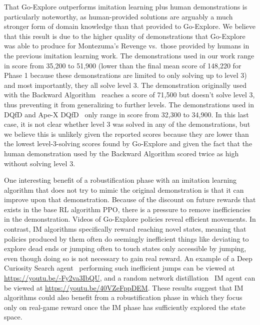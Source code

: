 \documentclass{article}
\begin{document}
That Go-Explore outperforms imitation learning plus human demonstrations is particularly noteworthy, as human-provided solutions are arguably a much stronger form of domain knowledge than that provided to Go-Explore. We believe that this result is due to the higher quality of demonstrations that Go-Explore was able to produce for Montezuma's Revenge vs.\ those provided by humans in the previous imitation learning work. The demonstrations used in our work range in score from 35,200 to 51,900 (lower than the final mean score of 148,220 for Phase 1 because these demonstrations are limited to only solving up to level 3) and most importantly, they all solve level 3. The demonstration originally used with the Backward Algorithm~\cite{salimans2018learning} reaches a score of 71,500 but doesn't solve level 3, thus preventing it from generalizing to further levels. The demonstrations used in DQfD and Ape-X DQfD~\cite{hester2017deep,pohlen2018observe} only range in score from 32,300 to 34,900. In this last case, it is not clear whether level 3 was solved in any of the demonstrations, but we believe this is unlikely given the reported scores because they are lower than the lowest level-3-solving scores found by Go-Explore and given the fact that the human demonstration used by the Backward Algorithm scored twice as high without solving level 3.

One interesting benefit of a robustification phase with an imitation learning algorithm that does not try to mimic the original demonstration is that it can improve upon that demonstration. Because of the discount on future rewards that exists in the base RL algorithm PPO, there is a pressure to remove inefficiencies in the demonstration. Videos of Go-Explore policies reveal efficient movements. In contrast, IM algorithms specifically reward reaching novel states, meaning that policies produced by them often do seemingly inefficient things like deviating to explore dead ends or jumping often to touch states only accessible by jumping, even though doing so is not necessary to gain real reward. An example of a Deep Curiosity Search agent~\cite{Stanton2018DeepCS} performing such inefficient jumps can be viewed at \url{https://youtu.be/-Fy2va3IbQU}, and a random network distillation~\cite{burda:rnd2018} IM agent can be viewed at \url{https://youtu.be/40VZeFppDEM}. These results suggest that IM algorithms could also benefit from a robustification phase in which they focus only on real-game reward once the IM phase has sufficiently explored the state space.
\end{document}
